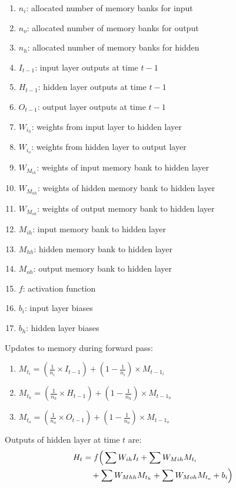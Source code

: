 \documentclass[conference]{IEEEtran}
\begin{document}
\begin{enumerate}
	\item $n_i$: allocated number of memory banks for input
	\item $n_o$: allocated number of memory banks for output
	\item $n_h$: allocated number of memory banks for hidden
	\item $I_{t-1}$: input layer outputs at time $t-1$
	\item $H_{t-1}$: hidden layer outputs at time $t-1$
	\item $O_{t-1}$: output layer outputs at time $t-1$
	\item $W_{i_h}$: weights from input layer to hidden layer
	\item $W_{i_o}$: weights from hidden layer to output layer
	\item $W_{M_{ih}}$: weights of input memory bank to hidden layer
	\item $W_{M_{hh}}$: weights of hidden memory bank to hidden layer
	\item $W_{M_{oh}}$: weights of output memory bank to hidden layer
	\item $M_{ih}$: input memory bank to hidden layer
	\item $M_{hh}$: hidden memory bank to hidden layer
	\item $M_{oh}$: output memory bank to hidden layer
	\item $f$: activation function
	\item $b_i$: input layer biases
	\item $b_h$: hidden layer biases
\end{enumerate}

Updates to memory during forward pass:

\begin{enumerate}[]
	\item $M_{t_{i}} = \left(\tfrac{1}{n_{i}} \times I_{t-1}\right) + \left(1 - \tfrac{1}{n_{i}}\right) \times M_{t-1_{i}}$
	
	\item $M_{t_{h}} = \left(\tfrac{1}{n_{h}} \times H_{t-1}\right) + \left(1 - \tfrac{1}{n_{h}}\right) \times M_{t-1_{h}}$
	
	\item $M_{t_{o}} = \left(\tfrac{1}{n_{o}} \times O_{t-1}\right) + \left(1 - \tfrac{1}{n_{o}}\right) \times M_{t-1_{o}}$
\end{enumerate}

Outputs of hidden layer at time $t$ are:
\begin{align*}
	H_{t} &= f\Big( \sum W_{ih} I_{t} + \sum W_{Mi h} M_{t_i} \notag \\
	&\quad + \sum W_{Mh h} M_{t_h} + \sum W_{Mo h} M_{t_o} + b_{i} \Big)
\end{align*}
\end{document}
